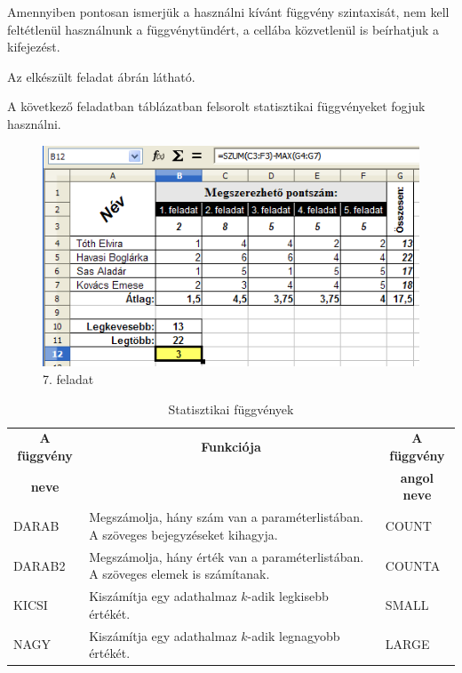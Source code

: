 Amennyiben pontosan ismerjük a használni kívánt függvény
szintaxisát, nem kell feltétlenül használnunk a
függvénytündért, a cellába közvetlenül is beírhatjuk a
kifejezést.

\clearpage
Az elkészült feladat  ábrán látható.

A következő feladatban  táblázatban
felsorolt statisztikai függvényeket fogjuk használni.

\begin{figure}[!h]
\begin{center}
\includegraphics[width=14.936cm]{oocalcv2-img40.png}
\caption{7. feladat}\label{7-feladatMegoldás}
\end{center}
\end{figure}

\begin{table}[!h]
\begin{center}
\caption{Statisztikai függvények}\label{StatisztikaiFüggvények}
\begin{tabular}{|m{2.5cm}|m{8cm}|m{3cm}|}
\hline
\multicolumn{1}{|c|}{\textbf{A függvény}}&
\multicolumn{1}{c|}{\textbf{Funkciója}}&
\multicolumn{1}{c|}{\textbf{A függvény}} \\
\multicolumn{1}{|c|}{\textbf{neve}} & &
\multicolumn{1}{c|}{\textbf{angol neve}} \\
\hline
DARAB &
Megszámolja, hány szám van a paraméterlistában. A szöveges
bejegyzéseket kihagyja. &
COUNT\\ \hline
DARAB2 &
Megszámolja, hány érték van a paraméterlistában. A
szöveges elemek is számítanak. &
COUNTA\\ \hline
KICSI &
Kiszámítja egy adathalmaz $k$-adik legkisebb értékét. &
SMALL\\ \hline
NAGY &
Kiszámítja egy adathalmaz $k$-adik legnagyobb értékét. &
LARGE\\ \hline
\end{tabular}
\end{center}
\end{table}

